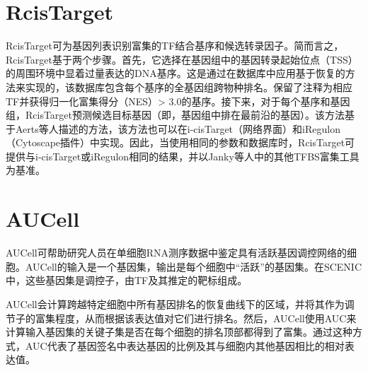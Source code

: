\section{RcisTarget}
  RcisTarget可为基因列表识别富集的TF结合基序和候选转录因子。简而言之，RcisTarget基于两个步骤。首先，它选择在基因组中的基因转录起始位点（TSS）的周围环境中显着过量表达的DNA基序。这是通过在数据库中应用基于恢复的方法来实现的，该数据库包含每个基序的全基因组跨物种排名。保留了注释为相应TF并获得归一化富集得分（NES）> 3.0的基序。接下来，对于每个基序和基因组，RcisTarget预测候选目标基因（即，基因组中排在最前沿的基因）。该方法基于Aerts等人\cite{aerts2010robust}描述的方法，该方法也可以在i-cisTarget（网络界面）\cite{herrmann2012cistarget}和iRegulon（Cytoscape插件）\cite{verfaillie2014iregulon}中实现。因此，当使用相同的参数和数据库时，RcisTarget可提供与i-cisTarget或iRegulon相同的结果，并以Janky等人\cite{verfaillie2014iregulon}中的其他TFBS富集工具为基准。
\section{AUCell}
  AUCell可帮助研究人员在单细胞RNA测序数据中鉴定具有活跃基因调控网络的细胞。AUCell的输入是一个基因集，输出是每个细胞中“活跃”的基因集。在SCENIC中，这些基因集是调控子，由TF及其推定的靶标组成。

  AUCell会计算跨越特定细胞中所有基因排名的恢复曲线下的区域，并将其作为调节子的富集程度，从而根据该表达值对它们进行排名。然后，AUCell使用AUC来计算输入基因集的关键子集是否在每个细胞的排名顶部都得到了富集。通过这种方式，AUC代表了基因签名中表达基因的比例及其与细胞内其他基因相比的相对表达值。

